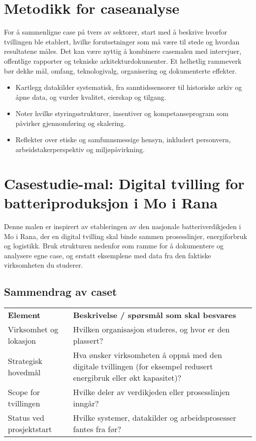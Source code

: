 \section{Metodikk for caseanalyse}
For å sammenligne case på tvers av sektorer, start med å beskrive hvorfor tvillingen ble etablert, hvilke forutsetninger som må være til stede og hvordan resultatene måles. Det kan være nyttig å kombinere casemalen med intervjuer, offentlige rapporter og tekniske arkitekturdokumenter. Et helhetlig rammeverk bør dekke mål, omfang, teknologivalg, organisering og dokumenterte effekter.

\begin{itemize}
    \item Kartlegg datakilder systematisk, fra sanntidssensorer til historiske arkiv og åpne data, og vurder kvalitet, eierskap og tilgang.
    \item Noter hvilke styringsstrukturer, insentiver og kompetanseprogram som påvirker gjennomføring og skalering.
    \item Reflekter over etiske og samfunnsmessige hensyn, inkludert personvern, arbeidstakerperspektiv og miljøpåvirkning.
\end{itemize}

\section{Casestudie-mal: Digital tvilling for batteriproduksjon i Mo i Rana}
Denne malen er inspirert av etableringen av den nasjonale batteriverdikjeden i Mo i Rana, der en digital tvilling skal binde sammen prosesslinjer, energiforbruk og logistikk. Bruk strukturen nedenfor som ramme for å dokumentere og analysere egne case, og erstatt eksemplene med data fra den faktiske virksomheten du studerer.

\subsection{Sammendrag av caset}
\begin{tabular}{p{}p{}}
\textbf{Element} & \textbf{Beskrivelse / spørsmål som skal besvares} \\
Virksomhet og lokasjon & Hvilken organisasjon studeres, og hvor er den plassert? \\
Strategisk hovedmål & Hva ønsker virksomheten å oppnå med den digitale tvillingen (for eksempel redusert energibruk eller økt kapasitet)? \\
Scope for tvillingen & Hvilke deler av verdikjeden eller prosesslinjen inngår? \\
Status ved prosjektstart & Hvilke systemer, datakilder og arbeidsprosesser fantes fra før? \\
\end{tabular}

